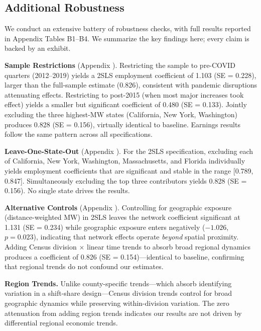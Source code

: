 \documentclass[12pt]{article}
\begin{document}
\subsection{Additional Robustness}

We conduct an extensive battery of robustness checks, with full results reported in Appendix Tables B1--B4. We summarize the key findings here; every claim is backed by an exhibit.

\textbf{Sample Restrictions} (Appendix ). Restricting the sample to pre-COVID quarters (2012--2019) yields a 2SLS employment coefficient of 1.103 (SE = 0.228), larger than the full-sample estimate (0.826), consistent with pandemic disruptions attenuating effects. Restricting to post-2015 (when most major increases took effect) yields a smaller but significant coefficient of 0.480 (SE = 0.133). Jointly excluding the three highest-MW states (California, New York, Washington) produces 0.828 (SE = 0.156), virtually identical to baseline. Earnings results follow the same pattern across all specifications.

\textbf{Leave-One-State-Out} (Appendix ). For the 2SLS specification, excluding each of California, New York, Washington, Massachusetts, and Florida individually yields employment coefficients that are significant and stable in the range [0.789, 0.847]. Simultaneously excluding the top three contributors yields 0.828 (SE = 0.156). No single state drives the results.

\textbf{Alternative Controls} (Appendix ). Controlling for geographic exposure (distance-weighted MW) in 2SLS leaves the network coefficient significant at 1.131 (SE = 0.234) while geographic exposure enters negatively ($-1.026$, $p = 0.023$), indicating that network effects operate \textit{beyond} spatial proximity. Adding Census division $\times$ linear time trends to absorb broad regional dynamics produces a coefficient of 0.826 (SE = 0.154)---identical to baseline, confirming that regional trends do not confound our estimates.

\textbf{Region Trends.} Unlike county-specific trends---which absorb identifying variation in a shift-share design---Census division trends control for broad geographic dynamics while preserving within-division variation. The zero attenuation from adding region trends indicates our results are not driven by differential regional economic trends.


\end{document}
